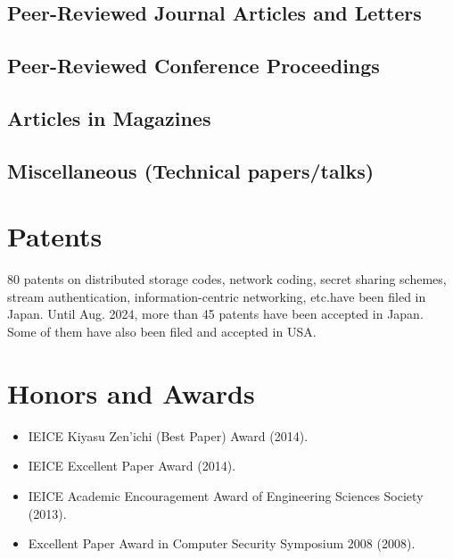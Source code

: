 \subsection*{Peer-Reviewed Journal Articles and Letters}



\subsection*{Peer-Reviewed Conference Proceedings}


\subsection*{Articles in Magazines}


\subsection*{Miscellaneous (Technical papers/talks)}



\section*{Patents}
80 patents on distributed storage codes, network coding, secret sharing schemes, stream authentication, information-centric networking, etc.\@ have been filed in Japan. Until Aug. 2024, more than 45 patents have been accepted in Japan. Some of them have also been filed and accepted in USA.



\section*{Honors and Awards}
\begin{itemize}
\item IEICE Kiyasu Zen'ichi (Best Paper) Award (2014).
\item IEICE Excellent Paper Award (2014).
\item IEICE Academic Encouragement Award of Engineering Sciences Society (2013).
\item Excellent Paper Award in Computer Security Symposium 2008 (2008).
\end{itemize}


